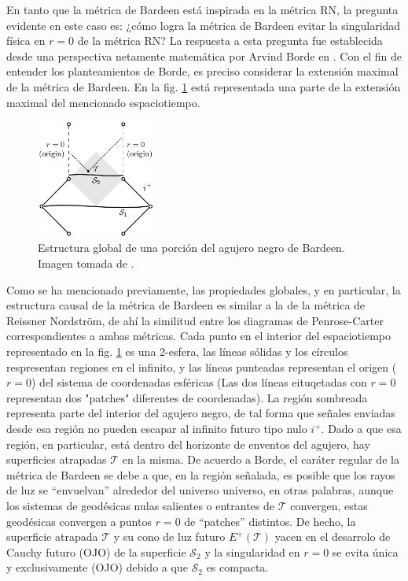 \documentclass{article}
\numberwithin{equation}{section}
\theoremstyle{definition}
\begin{document}
En tanto que la métrica de Bardeen está inspirada en la métrica RN, la pregunta evidente en este caso es: ¿cómo logra la métrica de Bardeen evitar la singularidad física en $r = 0$ de la métrica RN? La respuesta a esta pregunta fue establecida desde una perspectiva netamente matemática por Arvind Borde en \cite{borde1994,borde1996}. Con el fin de entender los planteamientos de Borde, es preciso considerar la extensión maximal de la métrica de Bardeen. En la fig. \ref{fig: bardeen diagram} está representada una parte de la extensión maximal del mencionado espaciotiempo.\\

\begin{figure}[h!]
	\centering
	\includegraphics[width=0.35\textwidth]{bardeenDiagram}
	\caption{Estructura global de una porción del agujero negro de Bardeen. Imagen tomada de \cite{borde1994}.}
	\label{fig: bardeen diagram}
\end{figure}

Como se ha mencionado previamente, las propiedades globales, y en particular, la estructura causal de la métrica de Bardeen es similar a la de la métrica de Reissner Nordström, de ahí la similitud entre los diagramas de Penrose-Carter correspondientes a ambas métricas. Cada punto en el interior del espaciotiempo representado en la fig. \ref{fig: bardeen diagram} es una 2-esfera, las líneas sólidas y los círculos respresentan regiones en el infinito, y las líneas punteadas representan el origen ($r = 0$) del sistema de coordenadas esféricas (Las dos líneas eituqetadas con $r = 0$ representan dos "patches" diferentes de coordenadas). La región sombreada representa parte del interior del agujero negro, de tal forma que señales enviadas desde esa región no pueden escapar al infinito futuro tipo nulo $i^{+}$. Dado a que esa región, en particular, está dentro del horizonte de enventos del agujero, hay superficies atrapadas $\mathcal{T}$ en la misma. De acuerdo a Borde, el caráter regular de la métrica de Bardeen se debe a que, en la región señalada, es posible que los rayos de luz se ``envuelvan'' alrededor del universo universo, en otras palabras, aunque los sistemas de geodésicas nulas salientes o entrantes de $\mathcal{T}$ convergen, estas geodésicas convergen a puntos $r = 0$ de ``patches'' distintos. De hecho, la superficie atrapada $\mathcal{T}$ y su cono de luz futuro $E^{+}(\mathcal{T})$ yacen en el desarrolo de Cauchy futuro (OJO) de la superficie $\mathcal{S}_{2}$ y la singularidad en $r = 0$ se evita única y exclusivamente (OJO) debido a que $\mathcal{S}_{2}$ es compacta.\\
\end{document}
